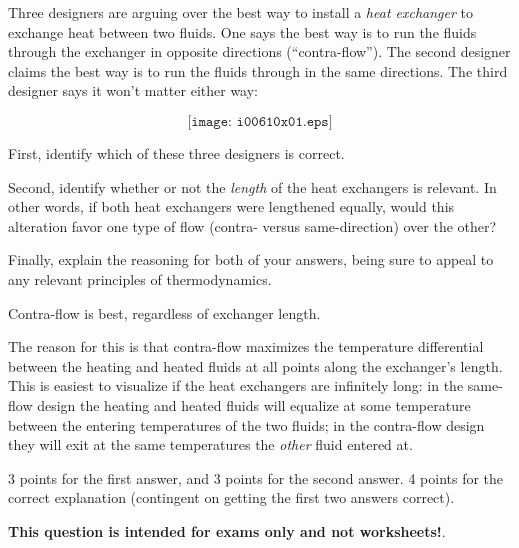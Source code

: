 

Three designers are arguing over the best way to install a {\it heat exchanger} to exchange heat between two fluids.  One says the best way is to run the fluids through the exchanger in opposite directions (``contra-flow'').  The second designer claims the best way is to run the fluids through in the same directions.  The third designer says it won't matter either way:

$$\texttt{[image: i00610x01.eps]}$$

First, identify which of these three designers is correct.

\vskip 10pt

Second, identify whether or not the {\it length} of the heat exchangers is relevant.  In other words, if both heat exchangers were lengthened equally, would this alteration favor one type of flow (contra- versus same-direction) over the other?

\vskip 10pt

Finally, explain the reasoning for both of your answers, being sure to appeal to any relevant principles of thermodynamics.







Contra-flow is best, regardless of exchanger length.

The reason for this is that contra-flow maximizes the temperature differential between the heating and heated fluids at all points along the exchanger's length.  This is easiest to visualize if the heat exchangers are infinitely long: in the same-flow design the heating and heated fluids will equalize at some temperature between the entering temperatures of the two fluids; in the contra-flow design they will exit at the same temperatures the {\it other} fluid entered at.

\vskip 10pt

3 points for the first answer, and 3 points for the second answer.  4 points for the correct explanation (contingent on getting the first two answers correct).







{\bf This question is intended for exams only and not worksheets!}.


